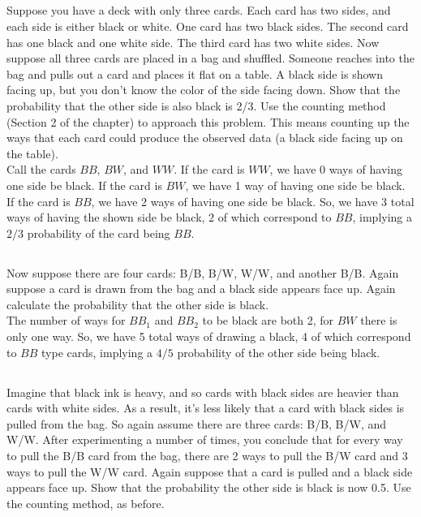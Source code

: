 \documentclass{article}
\begin{document}
\subsection{}
Suppose you have a deck with only three cards. Each card has two sides,
and each side is either black or white. One card has two black sides.
The second card has one black and one white side. The third card has two
white sides. Now suppose all three cards are placed in a bag and shuffled.
Someone reaches into the bag and pulls out a card and places it flat on a table.
A black side is shown facing up, but you don’t know the color of the side facing
down. Show that the probability that the other side is also black is 2/3.
Use the counting method (Section 2 of the chapter) to approach this problem.
This means counting up the ways that each card could produce the observed data
(a black side facing up on the table). \\

Call the cards $BB$, $BW$, and $WW$. If the card is $WW$, we have 0 ways of having
one side be black. If the card is $BW$, we have 1 way of having one side be black.
If the card is $BB$, we have 2 ways of having one side be black. So, we have 3 total
ways of having the shown side be black, 2 of which correspond to $BB$, implying a
$2/3$ probability of the card being $BB$.

\subsection{}
Now suppose there are four cards: B/B, B/W, W/W, and another B/B.
Again suppose a card is drawn from the bag and a black side appears face up.
Again calculate the probability that the other side is black. \\

The number of ways for $BB_1$ and $BB_2$ to be black are both 2, for $BW$ there
is only one way. So, we have 5 total ways of drawing a black, 4 of which correspond
to $BB$ type cards, implying a $4/5$ probability of the other side being black.

\subsection{}
Imagine that black ink is heavy, and so cards with black sides are heavier than
cards with white sides. As a result, it’s less likely that a card with black
sides is pulled from the bag. So again assume there are three cards: B/B, B/W,
and W/W. After experimenting a number of times, you conclude that for every way
to pull the B/B card from the bag, there are 2 ways to pull the B/W card and 3
ways to pull the W/W card. Again suppose that a card is pulled and a black side
appears face up. Show that the probability the other side is black is now 0.5.
Use the counting method, as before. \\
\end{document}

